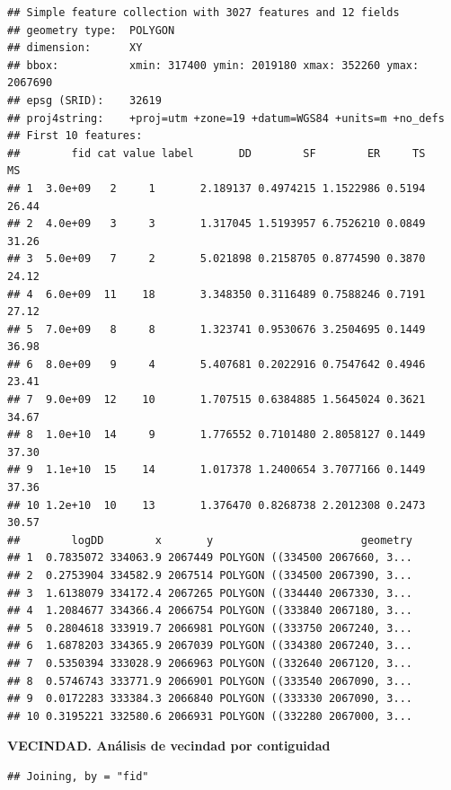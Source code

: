 \documentclass[11pt,]{article}
\newenvironment{Shaded}{\begin{snugshade}}{\end{snugshade}}
\newcommand{\KeywordTok}[1]{\textcolor[rgb]{0.13,0.29,0.53}{\textbf{#1}}}
\newcommand{\StringTok}[1]{\textcolor[rgb]{0.31,0.60,0.02}{#1}}
\newcommand{\OperatorTok}[1]{\textcolor[rgb]{0.81,0.36,0.00}{\textbf{#1}}}
\newcommand{\NormalTok}[1]{#1}
\begin{document}
\begin{verbatim}
## Simple feature collection with 3027 features and 12 fields
## geometry type:  POLYGON
## dimension:      XY
## bbox:           xmin: 317400 ymin: 2019180 xmax: 352260 ymax: 2067690
## epsg (SRID):    32619
## proj4string:    +proj=utm +zone=19 +datum=WGS84 +units=m +no_defs
## First 10 features:
##        fid cat value label       DD        SF        ER     TS    MS
## 1  3.0e+09   2     1       2.189137 0.4974215 1.1522986 0.5194 26.44
## 2  4.0e+09   3     3       1.317045 1.5193957 6.7526210 0.0849 31.26
## 3  5.0e+09   7     2       5.021898 0.2158705 0.8774590 0.3870 24.12
## 4  6.0e+09  11    18       3.348350 0.3116489 0.7588246 0.7191 27.12
## 5  7.0e+09   8     8       1.323741 0.9530676 3.2504695 0.1449 36.98
## 6  8.0e+09   9     4       5.407681 0.2022916 0.7547642 0.4946 23.41
## 7  9.0e+09  12    10       1.707515 0.6384885 1.5645024 0.3621 34.67
## 8  1.0e+10  14     9       1.776552 0.7101480 2.8058127 0.1449 37.30
## 9  1.1e+10  15    14       1.017378 1.2400654 3.7077166 0.1449 37.36
## 10 1.2e+10  10    13       1.376470 0.8268738 2.2012308 0.2473 30.57
##        logDD        x       y                       geometry
## 1  0.7835072 334063.9 2067449 POLYGON ((334500 2067660, 3...
## 2  0.2753904 334582.9 2067514 POLYGON ((334500 2067390, 3...
## 3  1.6138079 334172.4 2067265 POLYGON ((334440 2067330, 3...
## 4  1.2084677 334366.4 2066754 POLYGON ((333840 2067180, 3...
## 5  0.2804618 333919.7 2066981 POLYGON ((333750 2067240, 3...
## 6  1.6878203 334365.9 2067039 POLYGON ((334380 2067240, 3...
## 7  0.5350394 333028.9 2066963 POLYGON ((332640 2067120, 3...
## 8  0.5746743 333771.9 2066901 POLYGON ((333540 2067090, 3...
## 9  0.0172283 333384.3 2066840 POLYGON ((333330 2067090, 3...
## 10 0.3195221 332580.6 2066931 POLYGON ((332280 2067000, 3...
\end{verbatim}

\textbf{VECINDAD. Análisis de vecindad por contiguidad}

\begin{Shaded}
\end{Shaded}

\begin{verbatim}
## Joining, by = "fid"
\end{verbatim}
\end{document}
